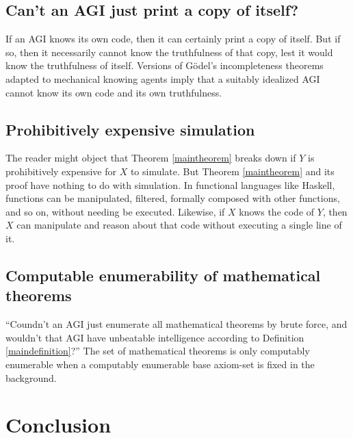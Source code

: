 \documentclass[runningheads]{llncs}
\begin{document}
\subsection{Can't an AGI just print a copy of itself?}


If an AGI knows its own code,
then it can certainly print a copy of itself.
But if so, then it necessarily cannot know the truthfulness of that
copy, lest it would know the truthfulness of itself.
Versions of G\"odel's incompleteness theorems adapted \cite{reinhardt1985absolute} to
mechanical knowing agents imply that a suitably idealized AGI cannot know
its own code
and its own truthfulness.

\subsection{Prohibitively expensive simulation}

The reader might object that Theorem \ref{maintheorem} breaks down if $Y$ is prohibitively
expensive for $X$ to simulate. But Theorem \ref{maintheorem} and its
proof have nothing to do with simulation. In functional languages like
Haskell, functions can be manipulated, filtered,
formally composed with other functions, and so on, without needing
be executed.
Likewise, if $X$ knows the code
of $Y$, then $X$ can manipulate and reason about that code without executing a single line
of it.

\subsection{Computable enumerability of mathematical theorems}

``Coundn't an AGI just enumerate all mathematical theorems by brute force,
and wouldn't that AGI have
unbeatable intelligence according to Definition \ref{maindefinition}?''
The set of mathematical theorems is only computably enumerable when a computably
enumerable base axiom-set is fixed in the background.

\section{Conclusion}
\label{conclusionsection}
\end{document}
